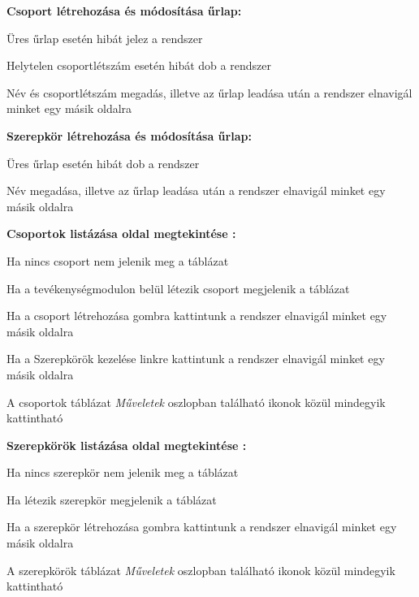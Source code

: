 \begin{compactitem}
    \item \textbf{Csoport létrehozása és módosítása űrlap:}
    \begin{compactitem}
        \item Üres űrlap esetén hibát jelez a rendszer
        \item Helytelen csoportlétszám esetén hibát dob a rendszer
        \item Név és csoportlétszám megadás, illetve az űrlap leadása után a rendszer elnavigál minket egy másik oldalra
    \end{compactitem}
    \item \textbf{Szerepkör létrehozása és módosítása űrlap:}
    \begin{compactitem}
        \item Üres űrlap esetén hibát dob a rendszer
        \item Név megadása, illetve az űrlap leadása után a rendszer elnavigál minket egy másik oldalra
    \end{compactitem}
    \item \textbf{Csoportok listázása oldal megtekintése :}
    \begin{compactitem}
        \item Ha nincs csoport nem jelenik meg a táblázat
        \item Ha a tevékenységmodulon belül létezik csoport megjelenik a táblázat
        \item Ha a csoport létrehozása gombra kattintunk a rendszer elnavigál minket egy másik oldalra
        \item Ha a Szerepkörök kezelése linkre kattintunk a rendszer elnavigál minket egy másik oldalra
        \item A csoportok táblázat \textit{Műveletek} oszlopban található ikonok közül mindegyik kattintható 
    \end{compactitem}
    \item \textbf{Szerepkörök listázása oldal megtekintése :}
    \begin{compactitem}
        \item Ha nincs szerepkör nem jelenik meg a táblázat
        \item Ha létezik szerepkör megjelenik a táblázat
        \item Ha a szerepkör létrehozása gombra kattintunk a rendszer elnavigál minket egy másik oldalra
        \item A szerepkörök táblázat \textit{Műveletek} oszlopban található ikonok közül mindegyik kattintható 
    \end{compactitem}
\end{compactitem}

